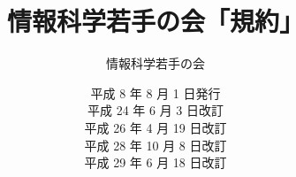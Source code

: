 %
%
%
%
\makeatletter
\def\labelenumi{第\theenumi 章　}
\def\theenumii{\arabic{enumii}}
\def\p@enumii{}
\def\labelenumii{第\theenumii 条　}
\def\theenumiii{\arabic{enumiii}}
\def\labelenumiii{\theenumiii　}
\def\p@enumiii{}
\makeatother
%
\def\@maketitle{
 \@title
 \@author
 \@date
 \vspace*{5cm}
}
\title{\Huge 情報科学若手の会「規約」}
\author{\huge 情報科学若手の会}
\date{\LARGE 平成   8 年  8 月   1 日発行\\
                         平成 24 年  6 月   3 日改訂\\
                         平成 26 年  4 月 19 日改訂\\
                         平成 28 年 10 月  8 日改訂\\
					     平成 29 年  6 月 18 日改訂}

